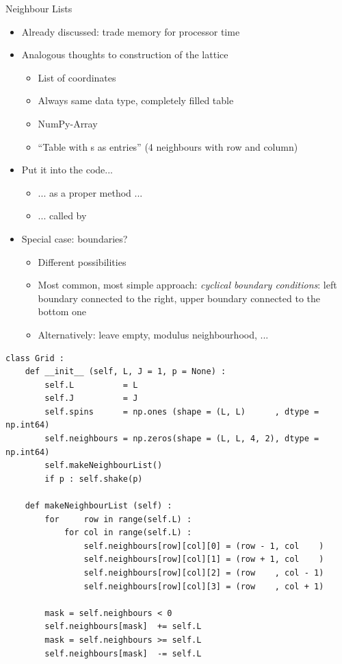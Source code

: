 \begin{frame}[fragile]{Neighbour Lists}
%
\begin{itemize}
\item Already discussed: trade memory for processor time
\item Analogous thoughts to construction of the lattice
	\begin{itemize}
	\item List of coordinates
	\item Always same data type, completely filled table
	\item[\Thus] NumPy-Array
	\item \enquote{Table with s as entries} (4 neighbours with row and column)
	\end{itemize}
\item Put it into the code...
	\begin{itemize}
	\item ... as a proper method ...
	\item ... called by 
	\end{itemize}
\item Special case: boundaries?
	\begin{itemize}
	\item Different possibilities
	\item Most common, most simple approach: \emph{cyclical boundary conditions}: left boundary connected to the right, upper boundary connected to the bottom one
	\item Alternatively: leave empty, modulus neighbourhood, ...
	\end{itemize}
\end{itemize}
%
\end{frame}


\begin{frame}[fragile]
%
\begin{codebox}
\begin{verbatim}
class Grid :
    def __init__ (self, L, J = 1, p = None) :
        self.L          = L
        self.J          = J
        self.spins      = np.ones (shape = (L, L)      , dtype = np.int64)
        self.neighbours = np.zeros(shape = (L, L, 4, 2), dtype = np.int64)
        self.makeNeighbourList()
        if p : self.shake(p)
    
    def makeNeighbourList (self) :
        for     row in range(self.L) :
            for col in range(self.L) :
                self.neighbours[row][col][0] = (row - 1, col    )
                self.neighbours[row][col][1] = (row + 1, col    )
                self.neighbours[row][col][2] = (row    , col - 1)
                self.neighbours[row][col][3] = (row    , col + 1)
                
        mask = self.neighbours < 0
        self.neighbours[mask]  += self.L
        mask = self.neighbours >= self.L
        self.neighbours[mask]  -= self.L
\end{verbatim}
\end{codebox}
%
\end{frame}

